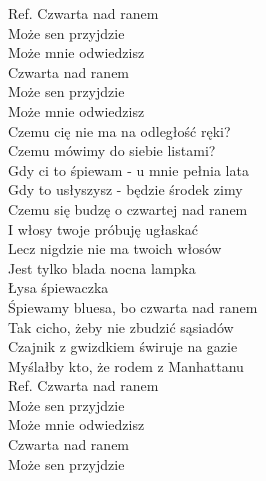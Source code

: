 
\begin{flushleft}
\vskip 3mm
Ref. Czwarta nad ranem \tab{} \\
\hspace{0.9cm}Może sen przyjdzie \tab{}\\
\hspace{0.9cm}Może mnie odwiedzisz \tab{}\\
\hspace{0.9cm}Czwarta nad ranem \tab{}\\
\hspace{0.9cm}Może sen przyjdzie \tab{}\\
\hspace{0.9cm}Może mnie odwiedzisz \tab{}\\
\vskip 3mm
Czemu cię nie ma na odległość ręki? \\
Czemu mówimy do siebie listami? \\
Gdy ci to śpiewam - u mnie pełnia lata \\
Gdy to usłyszysz - będzie środek zimy \\ 
\vskip 3mm
Czemu się budzę o czwartej nad ranem \\
I włosy twoje próbuję ugłaskać \\
Lecz nigdzie nie ma twoich włosów \\
Jest tylko blada nocna lampka\tab{} \\
Łysa śpiewaczka \tab{}\\
\vskip 3mm
Śpiewamy bluesa, bo czwarta nad ranem \\
Tak cicho, żeby nie zbudzić sąsiadów \\
Czajnik z gwizdkiem świruje na gazie \\
Myślałby kto, że rodem z Manhattanu \\
\vskip 3mm
Ref. Czwarta nad ranem \\
\hspace{0.9cm}Może sen przyjdzie \\
\hspace{0.9cm}Może mnie odwiedzisz \\
\hspace{0.9cm}Czwarta nad ranem \\
\hspace{0.9cm}Może sen przyjdzie \\

\end{flushleft}
